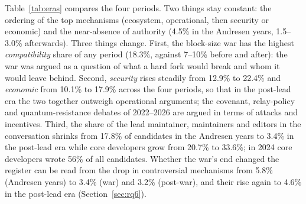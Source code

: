 \documentclass[sigconf,screen]{acmart}
\begin{document}
Table~\ref{tab:eras} compares the four periods. Two things stay constant: the ordering of the top mechanisms (ecosystem, operational, then security or economic) and the near-absence of authority (4.5\% in the Andresen years, 1.5--3.0\% afterwards). Three things change. First, the block-size war has the highest \emph{compatibility} share of any period (18.3\%, against 7--10\% before and after): the war was argued as a question of what a hard fork would break and whom it would leave behind. Second, \emph{security} rises steadily from 12.9\% to 22.4\% and \emph{economic} from 10.1\% to 17.9\% across the four periods, so that in the post-lead era the two together outweigh operational arguments; the covenant, relay-policy and quantum-resistance debates of 2022--2026 are argued in terms of attacks and incentives. Third, the share of the lead maintainer, maintainers and editors in the conversation shrinks from 17.8\% of candidates in the Andresen years to 3.4\% in the post-lead era while core developers grow from 20.7\% to 33.6\%; in 2024 core developers wrote 56\% of all candidates. Whether the war's end changed the register can be read from the drop in controversial mechanisms from 5.8\% (Andresen years) to 3.4\% (war) and 3.2\% (post-war), and their rise again to 4.6\% in the post-lead era (Section~\ref{sec:rq6}).
\end{document}
